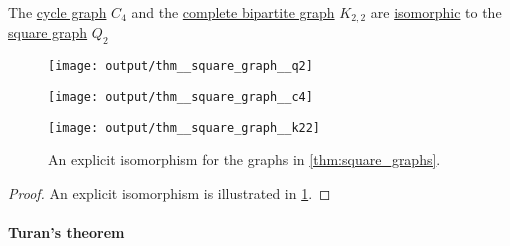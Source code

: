 \begin{proposition}\label{thm:square_graphs}
  The \hyperref[def:cycle_graph]{cycle graph} \( C_4 \) and the \hyperref[def:complete_multipartite_graph]{complete bipartite graph} \( K_{2,2} \) are \hyperref[def:undirected_graph/homomorphism]{isomorphic} to the \hyperref[def:hypercube_graph]{square graph} \( Q_2 \)


  \begin{figure}[!ht]
    \begin{subcaptionblock}{0.3\textwidth}
      \centering
      \texttt{[image: output/thm\_\_square\_graph\_\_q2]}
      \caption{\( Q_2 \)}\label{fig:thm:square_graphs/q2}
    \end{subcaptionblock}
    \hfill
    \begin{subcaptionblock}{0.3\textwidth}
      \centering
      \texttt{[image: output/thm\_\_square\_graph\_\_c4]}
      \caption{\( C_4 \)}\label{fig:thm:square_graphs/c4}
    \end{subcaptionblock}
    \hfill
    \begin{subcaptionblock}{0.3\textwidth}
      \centering
      \texttt{[image: output/thm\_\_square\_graph\_\_k22]}
      \caption{\( K_{2,2} \)}\label{fig:thm:square_graphs/k22}
    \end{subcaptionblock}
    \caption{An explicit isomorphism for the graphs in \cref{thm:square_graphs}.}\label{fig:thm:square_graphs}
  \end{figure}
\end{proposition}
\begin{proof}
  An explicit isomorphism is illustrated in \cref{fig:thm:square_graphs}.
\end{proof}

\paragraph{Turan's theorem}

